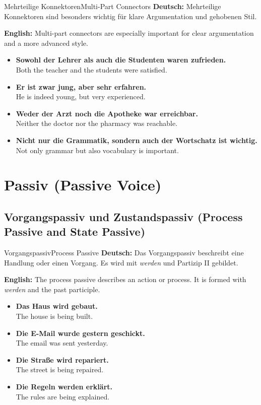 \documentclass[a4paper,11pt]{article}
\newcommand{\GermanText}[1]{\textbf{Deutsch: }#1\par}
\newcommand{\EnglishText}[1]{{\color{SoftGray}\textbf{English: }#1\par}}
\newcommand{\ExampleItem}[2]{\item \textbf{#1}\\{\color{SoftGray}#2}}
\begin{document}
\begin{grammarentry}{Mehrteilige Konnektoren}{Multi-Part Connectors}
    \GermanText{Mehrteilige Konnektoren sind besonders wichtig für klare Argumentation und gehobenen Stil.}
    \EnglishText{Multi-part connectors are especially important for clear argumentation and a more advanced style.}
    \begin{exbox}
        \begin{itemize}
            \ExampleItem{Sowohl der Lehrer als auch die Studenten waren zufrieden.}{Both the teacher and the students were satisfied.}
            \ExampleItem{Er ist zwar jung, aber sehr erfahren.}{He is indeed young, but very experienced.}
            \ExampleItem{Weder der Arzt noch die Apotheke war erreichbar.}{Neither the doctor nor the pharmacy was reachable.}
            \ExampleItem{Nicht nur die Grammatik, sondern auch der Wortschatz ist wichtig.}{Not only grammar but also vocabulary is important.}
        \end{itemize}
    \end{exbox}
\end{grammarentry}

\section{Passiv {\small (Passive Voice)}}

\subsection{Vorgangspassiv und Zustandspassiv {\small (Process Passive and State Passive)}}

\begin{grammarentry}{Vorgangspassiv}{Process Passive}
    \GermanText{Das Vorgangspassiv beschreibt eine Handlung oder einen Vorgang. Es wird mit \textit{werden} und Partizip II gebildet.}
    \EnglishText{The process passive describes an action or process. It is formed with \textit{werden} and the past participle.}
    \begin{exbox}
        \begin{itemize}
            \ExampleItem{Das Haus wird gebaut.}{The house is being built.}
            \ExampleItem{Die E-Mail wurde gestern geschickt.}{The email was sent yesterday.}
            \ExampleItem{Die Straße wird repariert.}{The street is being repaired.}
            \ExampleItem{Die Regeln werden erklärt.}{The rules are being explained.}
        \end{itemize}
    \end{exbox}
\end{grammarentry}
\end{document}
